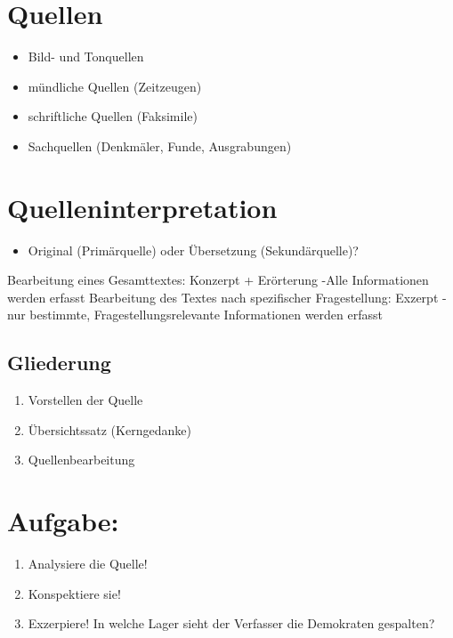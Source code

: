 \documentclass{article}
\begin{document}
\section{Quellen}
\begin{itemize}
  \item Bild- und Tonquellen
  \item mündliche Quellen (Zeitzeugen)
  \item schriftliche Quellen (Faksimile)
  \item Sachquellen (Denkmäler, Funde, Ausgrabungen)
\end{itemize}

\medskip




\section{Quelleninterpretation}
%

\begin{itemize}
  \item Original (Primärquelle) oder Übersetzung (Sekundärquelle)?
\end{itemize}

Bearbeitung eines Gesamttextes: Konzerpt + Erörterung
-Alle Informationen werden erfasst
Bearbeitung des Textes nach spezifischer Fragestellung: Exzerpt
-nur bestimmte, Fragestellungsrelevante Informationen werden erfasst

\subsection{Gliederung}
\begin{enumerate}
  \item Vorstellen der Quelle
  \item Übersichtssatz (Kerngedanke)
  \item Quellenbearbeitung
\end{enumerate}

\section{Aufgabe:}
\begin{enumerate}
  \item Analysiere die Quelle!
  \item Konspektiere sie!
  \item Exzerpiere! In welche Lager sieht der Verfasser die Demokraten gespalten?
\end{enumerate}
\end{document}
